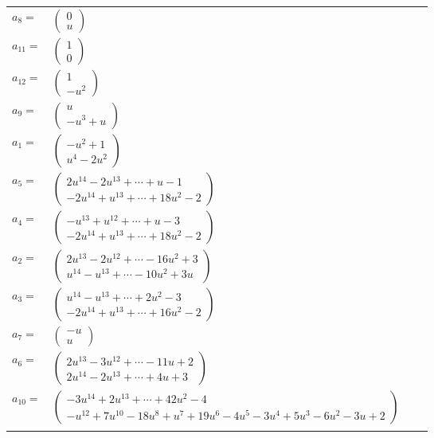 \documentclass[1p]{elsarticle_modified}
\theoremstyle{definition}
\begin{document}
\begin{tabular}{m{7pt} m{180pt} m{7pt} m{180pt} }
\flushright $a_{8}=$&$\begin{pmatrix}0\\u\end{pmatrix}$ \\
\flushright $a_{11}=$&$\begin{pmatrix}1\\0\end{pmatrix}$ \\
\flushright $a_{12}=$&$\begin{pmatrix}1\\- u^2\end{pmatrix}$ \\
\flushright $a_{9}=$&$\begin{pmatrix}u\\- u^3+u\end{pmatrix}$ \\
\flushright $a_{1}=$&$\begin{pmatrix}- u^2+1\\u^4-2 u^2\end{pmatrix}$ \\
\flushright $a_{5}=$&$\begin{pmatrix}2 u^{14}-2 u^{13}+\cdots+u-1\\-2 u^{14}+u^{13}+\cdots+18 u^2-2\end{pmatrix}$ \\
\flushright $a_{4}=$&$\begin{pmatrix}- u^{13}+u^{12}+\cdots+u-3\\-2 u^{14}+u^{13}+\cdots+18 u^2-2\end{pmatrix}$ \\
\flushright $a_{2}=$&$\begin{pmatrix}2 u^{13}-2 u^{12}+\cdots-16 u^2+3\\u^{14}- u^{13}+\cdots-10 u^2+3 u\end{pmatrix}$ \\
\flushright $a_{3}=$&$\begin{pmatrix}u^{14}- u^{13}+\cdots+2 u^2-3\\-2 u^{14}+u^{13}+\cdots+16 u^2-2\end{pmatrix}$ \\
\flushright $a_{7}=$&$\begin{pmatrix}- u\\u\end{pmatrix}$ \\
\flushright $a_{6}=$&$\begin{pmatrix}2 u^{13}-3 u^{12}+\cdots-11 u+2\\2 u^{14}-2 u^{13}+\cdots+4 u+3\end{pmatrix}$ \\
\flushright $a_{10}=$&$\begin{pmatrix}-3 u^{14}+2 u^{13}+\cdots+42 u^2-4\\- u^{12}+7 u^{10}-18 u^8+u^7+19 u^6-4 u^5-3 u^4+5 u^3-6 u^2-3 u+2\end{pmatrix}$\\&\end{tabular}
\end{document}
